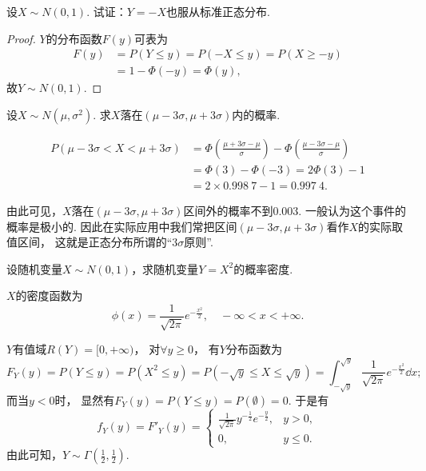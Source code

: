 \begin{example}
设\(X \sim N(0,1)\).
试证：\(Y=-X\)也服从标准正态分布.
\begin{proof}
\(Y\)的分布函数\(F(y)\)可表为\begin{align*}
	F(y) &= P(Y \leq y) = P(-X \leq y) = P(X \geq -y) \\
	&= 1 - \Phi(-y) = \Phi(y),
\end{align*}
故\(Y \sim N(0,1)\).
\end{proof}
\end{example}

\begin{example}
设\(X \sim N(\mu,\sigma^2)\).
求\(X\)落在\((\mu-3\sigma,\mu+3\sigma)\)内的概率.
\begin{solution}
\begin{align*}
	P(\mu-3\sigma<X<\mu+3\sigma)
	&= \Phi\left(\frac{\mu+3\sigma-\mu}{\sigma}\right)
	- \Phi\left(\frac{\mu-3\sigma-\mu}{\sigma}\right) \\
	&= \Phi(3) - \Phi(-3) = 2\Phi(3) - 1 \\
	&= 2 \times 0.998\ 7 - 1 = 0.997\ 4.
\end{align*}
\end{solution}
\end{example}
由此可见，\(X\)落在\((\mu-3\sigma,\mu+3\sigma)\)区间外的概率不到\(0.003\).
一般认为这个事件的概率是极小的.
因此在实际应用中我们常把区间\((\mu-3\sigma,\mu+3\sigma)\)看作\(X\)的实际取值区间，
这就是正态分布所谓的“\(3\sigma\)原则”.

\begin{example}
设随机变量\(X \sim N(0,1)\)，求随机变量\(Y = X^2\)的概率密度.
\begin{solution}
\(X\)的密度函数为\[
	\phi(x) = \frac{1}{\sqrt{2\pi}} e^{-\frac{x^2}{2}},
	\quad -\infty < x < +\infty.
\]

\(Y\)有值域\(R(Y) = [0,+\infty)\)，
对\(\forall y \geq 0\)，
有\(Y\)分布函数为\[
	F_Y(y) = P(Y \leq y) = P(X^2 \leq y)
	= P(-\sqrt{y} \leq X \leq \sqrt{y})
	= \int_{-\sqrt{y}}^{\sqrt{y}}{\frac{1}{\sqrt{2\pi}} e^{-\frac{x^2}{2}} \dd{x}};
\]
而当\(y < 0\)时，
显然有\(F_Y(y) = P(Y \leq y) = P(\emptyset) = 0\).
于是有\[
	f_Y(y)
	= F'_Y(y)
	= \left\{ \begin{array}{ll}
		\frac{1}{\sqrt{2\pi}} y^{-\frac{1}{2}} e^{-\frac{y}{2}}, & y > 0, \\
		0, & y \leq 0.
	\end{array} \right.
\]
由此可知，\(Y \sim \Gamma\left(\frac{1}{2},\frac{1}{2}\right)\).
\end{solution}
\end{example}

